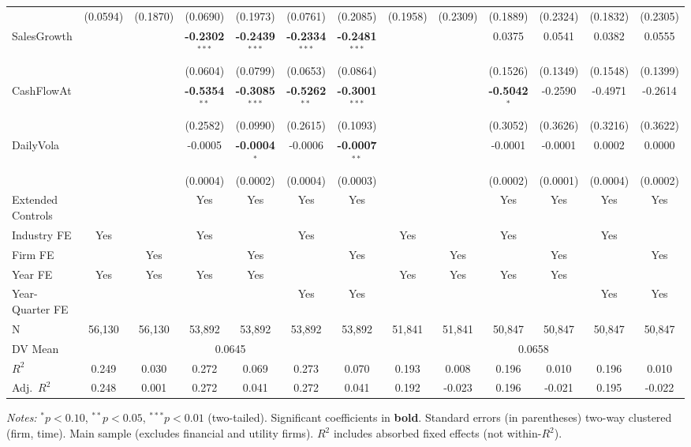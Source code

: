 \documentclass[11pt,a4paper]{article}
\begin{document}
\begin{table}[htbp]
\begin{tabular}{lcccccccccccc}
 & (0.0594) & (0.1870) & (0.0690) & (0.1973) & (0.0761) & (0.2085) & (0.1958) & (0.2309) & (0.1889) & (0.2324) & (0.1832) & (0.2305) \\
SalesGrowth &  &  & \textbf{-0.2302}$^{***}$ & \textbf{-0.2439}$^{***}$ & \textbf{-0.2334}$^{***}$ & \textbf{-0.2481}$^{***}$ &  &  & 0.0375 & 0.0541 & 0.0382 & 0.0555 \\
 &  &  & (0.0604) & (0.0799) & (0.0653) & (0.0864) &  &  & (0.1526) & (0.1349) & (0.1548) & (0.1399) \\
CashFlowAt &  &  & \textbf{-0.5354}$^{**}$ & \textbf{-0.3085}$^{***}$ & \textbf{-0.5262}$^{**}$ & \textbf{-0.3001}$^{***}$ &  &  & \textbf{-0.5042}$^{*}$ & -0.2590 & -0.4971 & -0.2614 \\
 &  &  & (0.2582) & (0.0990) & (0.2615) & (0.1093) &  &  & (0.3052) & (0.3626) & (0.3216) & (0.3622) \\
DailyVola &  &  & -0.0005 & \textbf{-0.0004}$^{*}$ & -0.0006 & \textbf{-0.0007}$^{**}$ &  &  & -0.0001 & -0.0001 & 0.0002 & 0.0000 \\
 &  &  & (0.0004) & (0.0002) & (0.0004) & (0.0003) &  &  & (0.0002) & (0.0001) & (0.0004) & (0.0002) \\
\midrule
Extended Controls &  &  & Yes & Yes & Yes & Yes &  &  & Yes & Yes & Yes & Yes \\
Industry FE & Yes &  & Yes &  & Yes &  & Yes &  & Yes &  & Yes &  \\
Firm FE &  & Yes &  & Yes &  & Yes &  & Yes &  & Yes &  & Yes \\
Year FE & Yes & Yes & Yes & Yes &  &  & Yes & Yes & Yes & Yes &  &  \\
Year-Quarter FE &  &  &  &  & Yes & Yes &  &  &  &  & Yes & Yes \\
\midrule
N & 56,130 & 56,130 & 53,892 & 53,892 & 53,892 & 53,892 & 51,841 & 51,841 & 50,847 & 50,847 & 50,847 & 50,847 \\
DV Mean & \multicolumn{6}{c}{0.0645} & \multicolumn{6}{c}{0.0658} \\
$R^2$ & 0.249 & 0.030 & 0.272 & 0.069 & 0.273 & 0.070 & 0.193 & 0.008 & 0.196 & 0.010 & 0.196 & 0.010 \\
Adj.~$R^2$ & 0.248 & 0.001 & 0.272 & 0.041 & 0.272 & 0.041 & 0.192 & -0.023 & 0.196 & -0.021 & 0.195 & -0.022 \\
\bottomrule
\end{tabular}
\begin{minipage}{\linewidth}
\vspace{2pt}\scriptsize
\textit{Notes:} $^{*}p<0.10$, $^{**}p<0.05$, $^{***}p<0.01$ (two-tailed).
 Significant coefficients in \textbf{bold}.
 Standard errors (in parentheses) two-way clustered (firm, time).
 Main sample (excludes financial and utility firms).
 $R^2$ includes absorbed fixed effects (not within-$R^2$).
\end{minipage}
\end{table}
\end{document}
